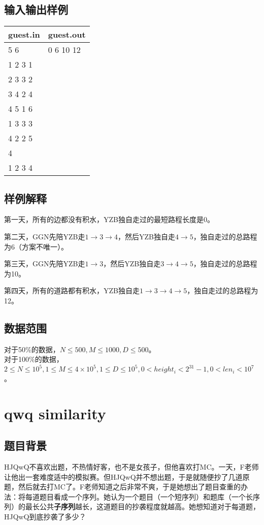 \documentclass[12pt]{ctexart}
\begin{document}
\subsection{输入输出样例}
\begin{tabular}{|p{6cm}|p{6cm}|}
	\hline guest.in&guest.out\\
	\hline5 6&0 6 10 12\\
			1 2 3 1&\\
			2 3 3 2&\\
			3 4 2 4&\\
			4 5 1 6&\\
			1 3 3 3&\\
			4 2 2 5&\\
			4&\\
			1 2 3 4&\\
	\hline
\end{tabular}
\subsection{样例解释}
第一天，所有的边都没有积水，YZB独自走过的最短路程长度是0。

第二天，GGN先陪YZB走$1\to3\to4$，然后YZB独自走$4\to5$，独自走过的总路程为6（方案不唯一）。

第三天，GGN先陪YZB走$1\to3$，然后YZB独自走$3\to4\to5$，独自走过的总路程为10。

第四天，所有的道路都有积水，YZB独自走$1\to3\to4\to5$，独自走过的总路程为12。
\subsection{数据范围}
\noindent 对于50\%的数据，$N\leq500,M\leq1000,D\leq500$。\\
对于100\%的数据，$2\leq N\leq10^5,1\leq M\leq4\times10^5,1\leq D\leq10^5,0<height_i<2^{31}-1,0<len_i<10^7$。

\newpage
\section{qwq similarity}
\subsection{题目背景}
HJQwQ不喜欢出题，不热情好客，也不是女孩子，但他喜欢打MC。一天，F老师让他出一套难度适中的模拟赛。但HJQwQ并不想出题，于是就随便抄了几道原题，然后就去打MC了。F老师知道之后非常不爽，于是她想出了题目查重的办法：将每道题目看成一个序列。她认为一个题目（一个短序列）和题库（一个长序列）的最长公共\textbf{子序列}越长，这道题目的抄袭程度就越高。她想知道对于每道题，HJQwQ到底抄袭了多少？
\end{document}
